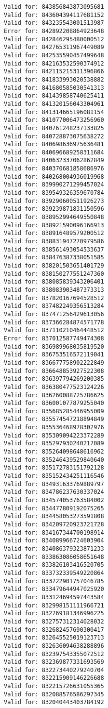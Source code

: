 \documentclass[11pt]{article}
\begin{document}
\begin{Verbatim}[commandchars=\\\{\}]
Valid for: 843856843873095681
Valid for: 843604394117681152
Valid for: 843235543001513987
Error for: 842892208864923648
Valid for: 842846295480000512
Valid for: 842765311967449089
Valid for: 842535590457499648
Valid for: 842163532590374912
Valid for: 842115215311396866
Valid for: 841833993020538882
Valid for: 841680585030541313
Valid for: 841439858740625411
Valid for: 841320156043304961
Valid for: 841314665196081154
Valid for: 841077006473256960
Valid for: 840761248237133825
Valid for: 840728873075638272
Valid for: 840698636975636481
Valid for: 840696689258311684
Valid for: 840632337062862849
Valid for: 840370681858686976
Valid for: 840268004936019968
Valid for: 839990271299457024
Valid for: 839549326359670784
Valid for: 839290600511926273
Valid for: 839239871831150596
Valid for: 838952994649550848
Valid for: 838921590096166913
Valid for: 838916489579200512
Valid for: 838831947270979586
Valid for: 838561493054533637
Valid for: 838476387338051585
Valid for: 838201503651401729
Valid for: 838150277551247360
Valid for: 838085839343206401
Valid for: 838083903487373313
Valid for: 837820167694528512
Valid for: 837482249356513284
Valid for: 837471256429613056
Valid for: 837366284874571778
Valid for: 837110210464448512
Error for: 837012587749474308
Valid for: 836989968035819520
Valid for: 836753516572119041
Valid for: 836677758902222849
Valid for: 836648853927522308
Valid for: 836397794269200385
Valid for: 836380477523124226
Valid for: 836260088725786625
Valid for: 836001077879255040
Valid for: 835685285446955009
Valid for: 835574547218894849
Valid for: 835536468978302976
Valid for: 835309094223372289
Valid for: 835297930240217089
Valid for: 835264098648616962
Valid for: 835246439529840640
Valid for: 835172783151792128
Valid for: 835152434251116546
Valid for: 834931633769889797
Valid for: 834786237630337024
Valid for: 834574053763584002
Valid for: 834477809192075265
Valid for: 834458053273591808
Valid for: 834209720923721728
Valid for: 834167344700198914
Valid for: 834089966724603904
Valid for: 834086379323871233
Valid for: 833863086058651648
Valid for: 833826103416520705
Valid for: 833732339549220864
Valid for: 833722901757046785
Valid for: 833479644947025920
Valid for: 833124694597443584
Valid for: 832998151111966721
Valid for: 832769181346996225
Valid for: 832757312314028032
Valid for: 832682457690300417
Valid for: 832645525019123713
Valid for: 832636094638288896
Valid for: 832397543355072512
Valid for: 832369877331693569
Valid for: 832273440279240704
Valid for: 832215909146226688
Valid for: 832215726631055365
Valid for: 832088576586297345
Valid for: 832040443403784192

\end{Verbatim}
\end{document}
